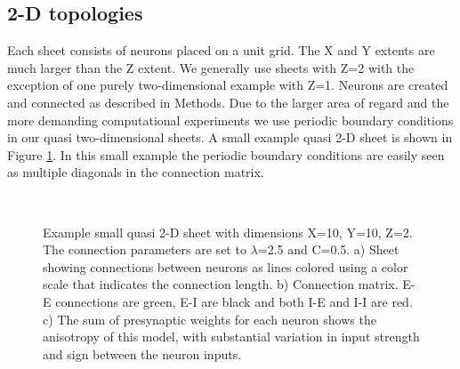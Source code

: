 \documentclass[12pt]{article}
\begin{document}
\subsection{2-D topologies}
Each sheet consists of neurons placed on a unit grid. 
The X and Y extents are much larger than the Z extent.
We generally use sheets with Z=2 with the exception of one purely two-dimensional example with Z=1.
Neurons are created and connected as described in Methods.
Due to the larger area of regard and the more demanding computational experiments we use periodic boundary conditions in our quasi two-dimensional sheets.
A small example quasi 2-D sheet is shown in Figure \ref{fig:sheet_structure}.
In this small example the periodic boundary conditions are easily seen as multiple diagonals in the connection matrix.

\begin{figure}[!htb]
 \caption{Example small quasi 2-D sheet with dimensions X=10, Y=10, Z=2. The connection parameters are set to $\lambda$=2.5 and C=0.5. 
 a)  Sheet showing connections between neurons as lines colored using a color scale that indicates the connection length. 
 b)  Connection matrix. E-E connections are green, E-I are black and both I-E and I-I  are red. 
 c) The sum of presynaptic weights for each neuron shows the anisotropy of this model, with substantial variation in input strength and sign between the neuron inputs.}
 \label{fig:sheet_structure}
 \\
\end{figure}
\end{document}
